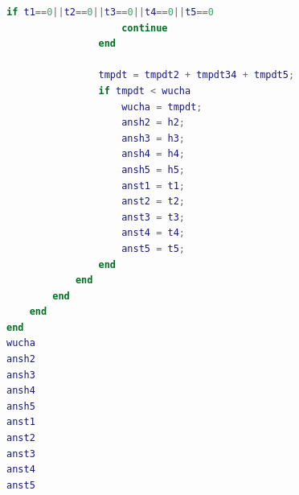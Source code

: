 \documentclass[hyperref,a4paper,UTF8]{ctexart}
\begin{document}
\begin{lstlisting}[language=Matlab]
                if t1==0||t2==0||t3==0||t4==0||t5==0
                    continue
                end
                
                tmpdt = tmpdt2 + tmpdt34 + tmpdt5;
                if tmpdt < wucha
                    wucha = tmpdt;
                    ansh2 = h2;
                    ansh3 = h3;
                    ansh4 = h4;
                    ansh5 = h5;
                    anst1 = t1;
                    anst2 = t2;
                    anst3 = t3;
                    anst4 = t4;
                    anst5 = t5;
                end
            end
        end 
    end
end
wucha
ansh2
ansh3
ansh4
ansh5
anst1
anst2
anst3
anst4
anst5
\end{lstlisting}
\end{document}
